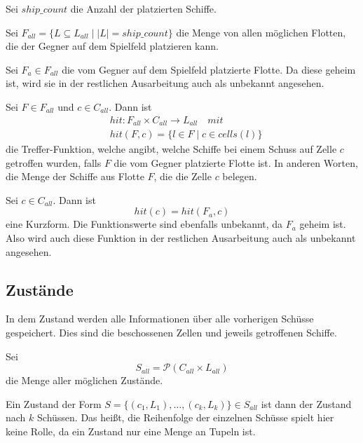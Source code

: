 \documentclass[a4paper,12pt]{llncs}
\numberwithin{equation}{section}
\begin{document}
\begin{definition}
Sei $ship\_count$ die Anzahl der platzierten Schiffe.
\end{definition}

\begin{definition}
Sei $F_{all}=\{L \subseteq L_{all} \mid |L|=ship\_count\}$ die Menge von allen möglichen Flotten, die der Gegner auf dem Spielfeld platzieren kann.
\end{definition}

\begin{definition}
Sei $F_a \in F_{all}$ die vom Gegner auf dem Spielfeld platzierte Flotte.
Da diese geheim ist, wird sie in der restlichen Ausarbeitung auch als unbekannt angesehen.
\end{definition}

\begin{definition}
Sei $F \in F_{all}$ und $c \in C_{all}$.
Dann ist 
\begin{align}
&hit:F_{all} \times C_{all} \rightarrow L_{all} \quad mit \nonumber\\
&hit(F, c)=\{l \in F \mid c \in cells(l)\} \nonumber
\end{align}
die Treffer-Funktion, welche angibt, welche Schiffe bei einem Schuss auf Zelle $c$ getroffen wurden, falls $F$ die vom Gegner platzierte Flotte ist. In anderen Worten, die Menge der Schiffe aus Flotte $F$, die die Zelle $c$ belegen.
\end{definition}

\begin{definition}
Sei $c \in C_{all}$.
Dann ist 
\[
hit(c)=hit(F_a, c)
\]
eine Kurzform. Die Funktionswerte sind ebenfalls unbekannt, da $F_a$ geheim ist. Also wird auch diese Funktion in der restlichen Ausarbeitung auch als unbekannt angesehen.
\end{definition}

\subsection{Zustände}

In dem Zustand werden alle Informationen über alle vorherigen Schüsse gespeichert.
Dies sind die beschossenen Zellen und jeweils getroffenen Schiffe.

\begin{definition}
Sei
\[
S_{all}=\mathscr{P}(C_{all}\times L_{all})
\]
die Menge aller möglichen Zustände.

Ein Zustand der Form $S=\{(c_1, L_1), \dots , (c_k, L_k)\}\in S_{all}$ ist dann der Zustand nach $k$ Schüssen.
Das heißt, die Reihenfolge der einzelnen Schüsse spielt hier keine Rolle, da ein Zustand nur eine Menge an Tupeln ist.
\end{definition}
\end{document}

